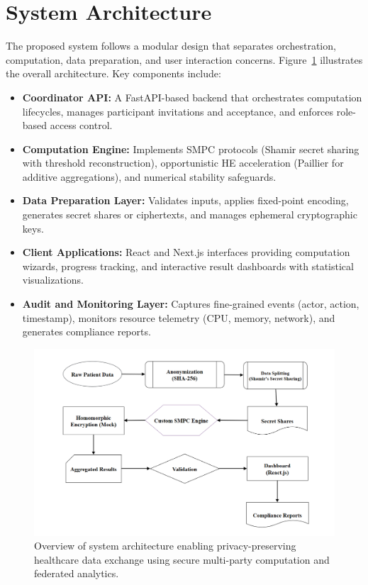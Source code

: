 \documentclass[conference]{IEEEtran}
\begin{document}
\section{System Architecture}
The proposed system follows a modular design that separates orchestration, computation, data preparation, and user interaction concerns. Figure~\ref{fig:architecture} illustrates the overall architecture. Key components include:

\begin{itemize}
    \item \textbf{Coordinator API:} A FastAPI-based backend that orchestrates computation lifecycles, manages participant invitations and acceptance, and enforces role-based access control.
    \item \textbf{Computation Engine:} Implements SMPC protocols (Shamir secret sharing with threshold reconstruction), opportunistic HE acceleration (Paillier for additive aggregations), and numerical stability safeguards.
    \item \textbf{Data Preparation Layer:} Validates inputs, applies fixed-point encoding, generates secret shares or ciphertexts, and manages ephemeral cryptographic keys.
    \item \textbf{Client Applications:} React and Next.js interfaces providing computation wizards, progress tracking, and interactive result dashboards with statistical visualizations.
    \item \textbf{Audit and Monitoring Layer:} Captures fine-grained events (actor, action, timestamp), monitors resource telemetry (CPU, memory, network), and generates compliance reports.
\end{itemize}

\begin{figure}[H]
    \centering
    \includegraphics[width=\linewidth]{architecture.png}
    \captionsetup{justification=justified,font=footnotesize}
    \caption{Overview of system architecture enabling privacy-preserving healthcare data exchange using secure multi-party computation and federated analytics.}
    \label{fig:architecture}
\end{figure}
\end{document}
